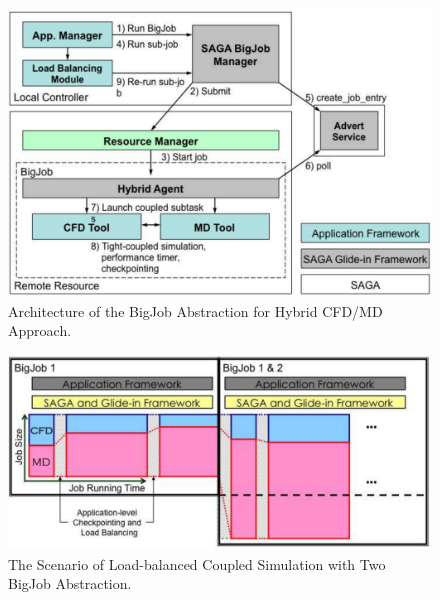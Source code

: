 \documentclass[a4paper]{article}
\newcommand{\jhanote}[1]{ {\textcolor{red} { ***Jha: #1 }}}
\newcommand{\jhanote}[1]{}
\begin{document}
\begin{figure}
\centering
\includegraphics  [scale=0.7, angle=0]{Image2_2}
\caption{Architecture of the BigJob Abstraction for Hybrid CFD/MD Approach.} 
\end{figure}

\begin{figure}
\centering
\includegraphics [scale=0.7, angle=0]{Image3_2}
\caption{The Scenario of Load-balanced Coupled Simulation with Two BigJob Abstraction.}
\end{figure}

\noindent 
\end{document}
